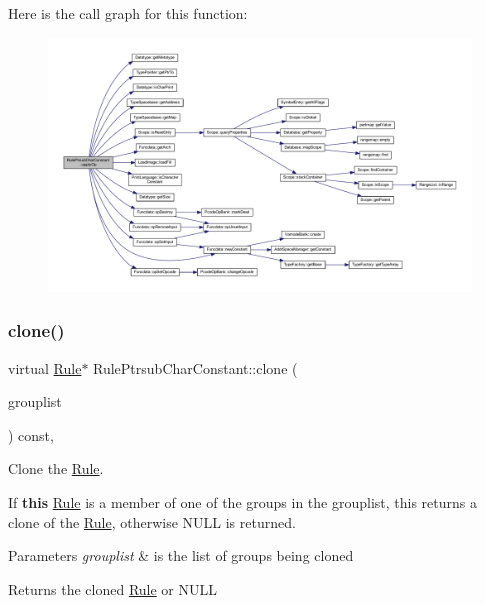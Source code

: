 Here is the call graph for this function\+:
\nopagebreak
\begin{figure}[H]
\begin{center}
\leavevmode
\includegraphics[width=350pt]{class_rule_ptrsub_char_constant_ab5a326704b8090e54f8afc9db135fd79_cgraph}
\end{center}
\end{figure}
\mbox{\label{class_rule_ptrsub_char_constant_a3e7b0e275531779c7df244f561d71dff}} 
\subsubsection{\texorpdfstring{clone()}{clone()}}
{\footnotesize\ttfamily virtual \mbox{\hyperlink{class_rule}{Rule}}$\ast$ Rule\+Ptrsub\+Char\+Constant\+::clone (\begin{DoxyParamCaption}\item[{const \mbox{\hyperlink{class_action_group_list}{Action\+Group\+List}} \&}]{grouplist }\end{DoxyParamCaption}) const\hspace{0.3cm}{\ttfamily [inline]}, {\ttfamily [virtual]}}



Clone the \mbox{\hyperlink{class_rule}{Rule}}. 

If {\bfseries{this}} \mbox{\hyperlink{class_rule}{Rule}} is a member of one of the groups in the grouplist, this returns a clone of the \mbox{\hyperlink{class_rule}{Rule}}, otherwise N\+U\+LL is returned. 
\begin{DoxyParams}{Parameters}
{\em grouplist} & is the list of groups being cloned \\
\hline
\end{DoxyParams}
\begin{DoxyReturn}{Returns}
the cloned \mbox{\hyperlink{class_rule}{Rule}} or N\+U\+LL 
\end{DoxyReturn}


